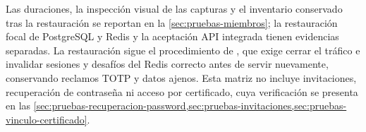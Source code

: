 Las duraciones, la inspección visual de las capturas y el inventario conservado tras la restauración se reportan en la \cref{sec:pruebas-miembros}; la restauración focal de PostgreSQL y Redis y la aceptación API integrada tienen evidencias separadas. La restauración sigue el procedimiento de , que exige cerrar el tráfico e invalidar sesiones y desafíos del Redis correcto antes de servir nuevamente, conservando reclamos TOTP y datos ajenos. Esta matriz no incluye invitaciones, recuperación de contraseña ni acceso por certificado, cuya verificación se presenta en las \cref{sec:pruebas-recuperacion-password,sec:pruebas-invitaciones,sec:pruebas-vinculo-certificado}.
